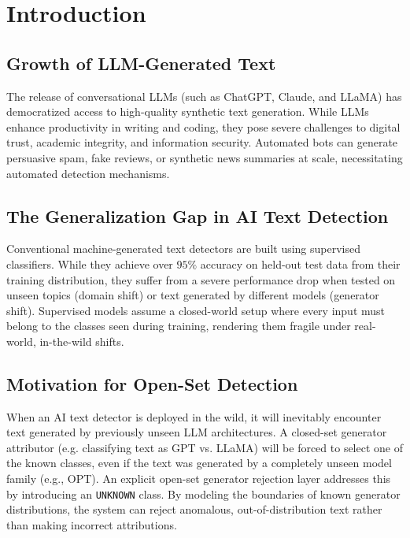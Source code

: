 \documentclass[12pt,a4paper]{report}
\begin{document}
\chapter{Introduction}
\label{ch:intro}

\section{Growth of LLM-Generated Text}
The release of conversational LLMs (such as ChatGPT, Claude, and LLaMA) has democratized access to high-quality synthetic text generation. While LLMs enhance productivity in writing and coding, they pose severe challenges to digital trust, academic integrity, and information security. Automated bots can generate persuasive spam, fake reviews, or synthetic news summaries at scale, necessitating automated detection mechanisms.

\section{The Generalization Gap in AI Text Detection}
Conventional machine-generated text detectors are built using supervised classifiers. While they achieve over $95\%$ accuracy on held-out test data from their training distribution, they suffer from a severe performance drop when tested on unseen topics (domain shift) or text generated by different models (generator shift). Supervised models assume a closed-world setup where every input must belong to the classes seen during training, rendering them fragile under real-world, in-the-wild shifts.

\section{Motivation for Open-Set Detection}
When an AI text detector is deployed in the wild, it will inevitably encounter text generated by previously unseen LLM architectures. A closed-set generator attributor (e.g. classifying text as GPT vs. LLaMA) will be forced to select one of the known classes, even if the text was generated by a completely unseen model family (e.g., OPT). An explicit open-set generator rejection layer addresses this by introducing an \texttt{UNKNOWN} class. By modeling the boundaries of known generator distributions, the system can reject anomalous, out-of-distribution text rather than making incorrect attributions.
\end{document}
